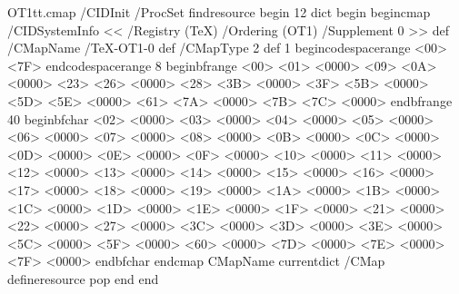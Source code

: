 \newcommand{\cref}[1]{Chapter~\ref{#1}}
\newcommand{\sref}[1]{Section~\ref{#1}}
\newcommand{\fref}[1]{Figure~\ref{#1}}
\newcommand{\tref}[1]{Table~\ref{#1}}
\newcommand{\lref}[1]{Listing~\ref{#1}}
\newcommand{\eref}[1]{Equation~\ref{#1}}

\usepackage[resetfonts]{cmap}

\begin{VerbatimOut}{OT1tt.cmap}
/CIDInit /ProcSet findresource begin
12 dict begin
begincmap
/CIDSystemInfo
<< /Registry (TeX)
/Ordering (OT1)
/Supplement 0
>> def
/CMapName /TeX-OT1-0 def
/CMapType 2 def
1 begincodespacerange
<00> <7F>
endcodespacerange
8 beginbfrange
<00> <01> <0000>
<09> <0A> <0000>
<23> <26> <0000>
<28> <3B> <0000>
<3F> <5B> <0000>
<5D> <5E> <0000>
<61> <7A> <0000>
<7B> <7C> <0000>
endbfrange
40 beginbfchar
<02> <0000>
<03> <0000>
<04> <0000>
<05> <0000>
<06> <0000>
<07> <0000>
<08> <0000>
<0B> <0000>
<0C> <0000>
<0D> <0000>
<0E> <0000>
<0F> <0000>
<10> <0000>
<11> <0000>
<12> <0000>
<13> <0000>
<14> <0000>
<15> <0000>
<16> <0000>
<17> <0000>
<18> <0000>
<19> <0000>
<1A> <0000>
<1B> <0000>
<1C> <0000>
<1D> <0000>
<1E> <0000>
<1F> <0000>
<21> <0000>
<22> <0000>
<27> <0000>
<3C> <0000>
<3D> <0000>
<3E> <0000>
<5C> <0000>
<5F> <0000>
<60> <0000>
<7D> <0000>
<7E> <0000>
<7F> <0000>
endbfchar
endcmap
CMapName currentdict /CMap defineresource pop
end
end
\end{VerbatimOut}